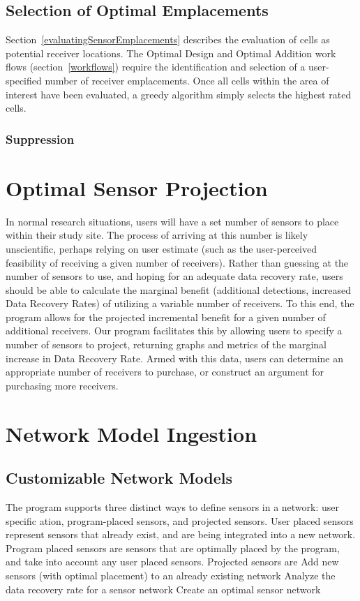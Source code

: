 \subsection{Selection of Optimal Emplacements}
Section~\ref{evaluatingSensorEmplacements} describes the evaluation of cells as potential receiver locations.  The Optimal Design and Optimal Addition work flows (section~\ref{workflows}) require the identification and selection of a user-specified number of receiver emplacements.  Once all cells within the area of interest have been evaluated, a greedy algorithm simply selects the highest rated cells.

\subsubsection{Suppression}



\section{Optimal Sensor Projection}
In normal research situations, users will have a set number of sensors to place within their study site.  The process of arriving at this number is likely unscientific, perhaps relying on user estimate (such as the user-perceived feasibility of receiving a given number of receivers).  Rather than guessing at the number of sensors to use, and hoping for an adequate data recovery rate, users should be able to calculate the marginal benefit (additional detections, increased Data Recovery Rates) of utilizing a variable number of receivers.   To this end, the program allows for the projected incremental benefit for a given number of additional receivers.  Our program facilitates this by allowing users to specify a number of sensors to project, returning graphs and metrics of the marginal increase in Data Recovery Rate.  Armed with this data, users can determine an appropriate number of receivers to purchase, or construct an argument for purchasing more receivers.

\section{Network Model Ingestion}
\subsection{Customizable Network Models}
The program supports three distinct ways to define sensors in a network: 
user specific ation, program-placed sensors, and projected sensors. 
User placed sensors represent sensors that already exist, and are being integrated into a new network.
Program placed sensors are sensors that are optimally placed by the program, and take into account any user placed sensors.
Projected sensors are 
Add new sensors (with optimal placement) to an already existing network
Analyze the data recovery rate for a sensor network
Create an optimal sensor network

